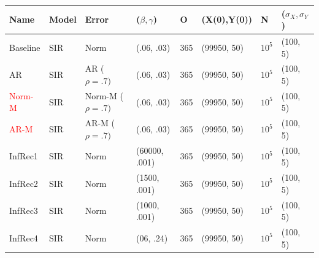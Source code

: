 \documentclass[12pt]{article}
\begin{document}

\begin{table}[]
\centering
\begin{tabular}{@{}llllllll@{}}
\toprule
\textbf{Name} & \textbf{Model} & \textbf{Error} & \textbf{($\beta, \gamma$)} & \textbf{O} & \textbf{(X(0),Y(0))} & \textbf{N} & \textbf{($\sigma_X, \sigma_Y$)} \\ \midrule
  Baseline        & SIR      &   Norm             & (.06, .03)                          &     365       &  (99950, 50)                    &  $10^5$          &(100, 5)                                \\ \midrule
  AR       & SIR      &   AR ($\rho=.7)$             & (.06, .03)                          &     365       &  (99950, 50)                    &  $10^5$          &(100, 5)                            \\ \midrule
  \textcolor{red}{Norm-M}      & SIR      &   Norm-M ($\rho=.7)$             & (.06, .03)                          &     365       &  (99950, 50)                    &  $10^5$          &(100, 5)                            \\ \midrule
   \textcolor{red}{AR-M}       & SIR      &   AR-M ($\rho=.7)$             & (.06, .03)                          &     365       &  (99950, 50)                    &  $10^5$          &(100, 5)                            \\ \midrule
  InfRec1       & SIR      &   Norm             & (60000, .001)                          &     365       &  (99950, 50)                    &  $10^5$          &(100, 5)\\
  InfRec2      & SIR      &   Norm             & (1500, .001)                          &     365       &  (99950, 50)                    &  $10^5$          &(100, 5)                                \\
  InfRec3      & SIR      &   Norm             & (1000, .001)                          &     365       &  (99950, 50)                    &  $10^5$          &(100, 5)                                \\
InfRec4      & SIR      &   Norm             & (06, .24)                          &     365       &  (99950, 50)                    &  $10^5$          &(100, 5)                                \\ \midrule

\end{tabular}
\end{table}
\end{document}
